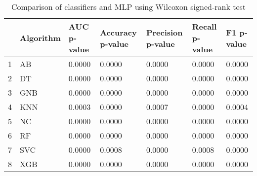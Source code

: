 \begin{table}
\footnotesize
\caption{Comparison of classifiers and MLP using Wilcoxon signed-rank test}
\label{tab:wilcoxon comparison}
\begin{tabular}{lllllll}
\hline
 & Algorithm & AUC p-value & Accuracy p-value & Precision p-value & Recall p-value & F1 p-value \\
\hline
1 & AB & 0.0000 & 0.0000 & 0.0000 & 0.0000 & 0.0000 \\
2 & DT & 0.0000 & 0.0000 & 0.0000 & 0.0000 & 0.0000 \\
3 & GNB & 0.0000 & 0.0000 & 0.0000 & 0.0000 & 0.0000 \\
4 & KNN & 0.0003 & 0.0000 & 0.0007 & 0.0000 & 0.0004 \\
5 & NC & 0.0000 & 0.0000 & 0.0000 & 0.0000 & 0.0000 \\
6 & RF & 0.0000 & 0.0000 & 0.0000 & 0.0000 & 0.0000 \\
7 & SVC & 0.0000 & 0.0008 & 0.0000 & 0.0008 & 0.0000 \\
8 & XGB & 0.0000 & 0.0000 & 0.0000 & 0.0000 & 0.0000 \\
\hline
\end{tabular}
\end{table}
